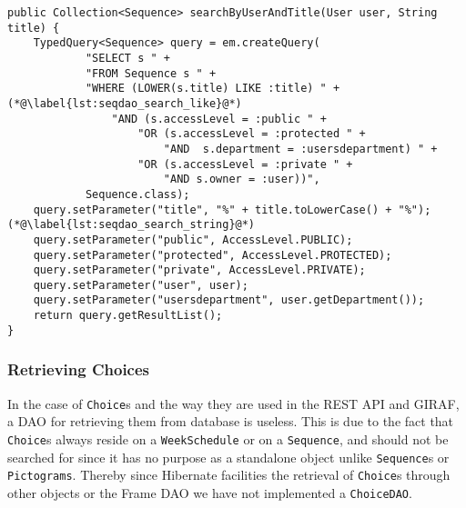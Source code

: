 \begin{lstlisting}[float, floatplacement=h, caption={The method in \texttt{SequenceDaoImpl} which allows for \texttt{Sequence}s to be searched for by title}, label={lst:seqdao_search}]
public Collection<Sequence> searchByUserAndTitle(User user, String title) {
    TypedQuery<Sequence> query = em.createQuery(
            "SELECT s " +
            "FROM Sequence s " +
            "WHERE (LOWER(s.title) LIKE :title) " +(*@\label{lst:seqdao_search_like}@*)
                "AND (s.accessLevel = :public " +
                    "OR (s.accessLevel = :protected " +
                        "AND  s.department = :usersdepartment) " +
                    "OR (s.accessLevel = :private " +
                        "AND s.owner = :user))",
            Sequence.class);
    query.setParameter("title", "%" + title.toLowerCase() + "%");(*@\label{lst:seqdao_search_string}@*)
    query.setParameter("public", AccessLevel.PUBLIC);
    query.setParameter("protected", AccessLevel.PROTECTED);
    query.setParameter("private", AccessLevel.PRIVATE);
    query.setParameter("user", user);
    query.setParameter("usersdepartment", user.getDepartment());
    return query.getResultList();
}
\end{lstlisting}

\subsubsection{Retrieving Choices}
In the case of \texttt{Choice}s and the way they are used in the REST API and GIRAF, a DAO for retrieving them from database is useless.
This is due to the fact that \texttt{Choice}s always reside on a \texttt{WeekSchedule} or on a \texttt{Sequence}, and should not be searched for since it has no purpose as a standalone object unlike \texttt{Sequence}s or \texttt{Pictograms}.
Thereby since Hibernate facilities the retrieval of \texttt{Choice}s through other objects or the Frame DAO we have not implemented a \texttt{ChoiceDAO}.